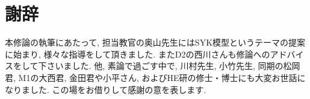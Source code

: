 \section*{謝辞}
本修論の執筆にあたって, 担当教官の奥山先生にはSYK模型というテーマの提案に始まり, 様々な指導をして頂きました. 
またD2の西川さんも修論へのアドバイスをして下さいました. 
他, 素論で過ごす中で, 川村先生, 小竹先生, 同期の松岡君, M1の大西君, 金田君や小平さん, 
およびHE研の修士・博士にも大変お世話になりました. 
この場をお借りして感謝の意を表します. 
\pagebreak